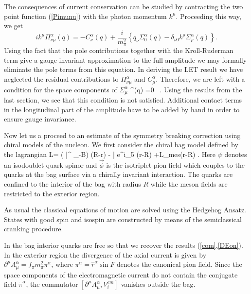 The consequences of current conservation can be studied by contracting
the two point function (\ref{Pimunu}) with the photon momentum $k^\mu$. 
Proceeding this way, we get
\begin{equation}
\label{gi}
ik^\mu \Pi_{\nu\mu}^\alpha (q) = - C^\alpha_\nu (q) + \frac{i}{m_\pi^2}
\left\{ q_\nu \Sigma_0^\alpha (q) - \delta_{\nu 0} k^\rho \Sigma_\rho^\alpha
 (q) \right\} .
\end{equation}
Using the fact that the pole contributions together with the Kroll-Ruderman
term  give a gauge invariant approximation to the full amplitude we may 
formally eliminate the pole terms from this equation. In deriving the
LET result we have neglected the residual contributions to 
$\Pi_{\nu\mu}^\alpha$ and $C_\mu^\alpha$. Therefore, we are left with
a condition for the space components of $\Sigma_\mu^\alpha$ 
\be
{}\cdot\vec{\Sigma}^\alpha (q) =0 \, .
\ee
Using the results from the last section, we see that this condition
is not satisfied. Additional contact terms in the longitudinal part
of the amplitude have to be added by hand in order to ensure gauge
invariance.
 
Now let us a proceed to an estimate of the symmetry breaking
correction using chiral models of the nucleon. We first consider
the chiral bag model \cite{BR88} defined by the lagrangian 
\be
\label{lcb}
{\cal L}= \left( \bar{\psi}\gamma^{\mu}\stackrel{\leftrightarrow}
{\partial}_{\mu}\psi -B\right) \Theta (R-r) -  \bar{\psi}
e^{i\gamma_5 \vec{\tau}\cdot\vec{\phi}}\psi\delta (r-R)
+{\cal L}_{mes}\Theta (r-R) \; .
\ee
Here $\psi$ denotes an isodoublet quark spinor and $\vec{\phi}$ is the
isotriplet  pion field which couples to the quarks at the bag surface 
via a chirally invariant interaction. The quarks are confined to the 
interior  of the bag with radius $R$ while the meson
fields are restricted to the exterior region.

As usual the classical equations of motion are solved using  the Hedgehog
Ansatz. States with good spin and isospin are constructed by means of the 
semiclassical cranking procedure.

In the bag interior quarks are free so that we recover the results
(\ref{com},\ref{DEon}). In the exterior region the divergence of the axial 
current
is given by $\partial^{\mu}A_{\mu}^{\alpha}=f_{\pi}m_{\pi}^{2}\pi^{\alpha}$,
where $\pi^{\alpha}=\hat{r}^{\alpha}\sin F$ denotes the canonical pion field.
Since the space components of the electromagnetic current do not contain the
conjugate field $\dot{\pi}^{\alpha}$, the commutator 
$[\partial^{\mu}A_{\mu}^{\alpha},V_{i}^{em}]$ vanishes outside the bag.

